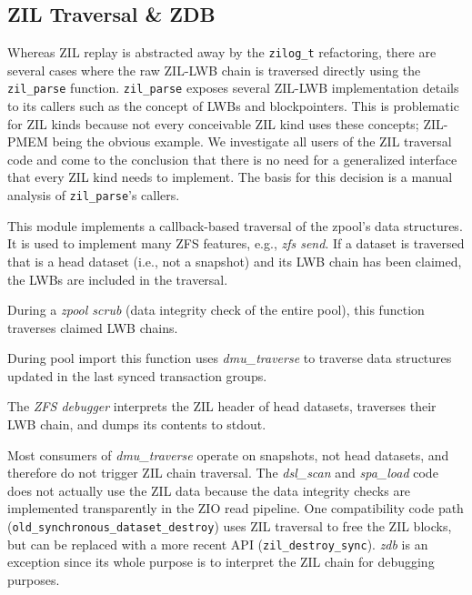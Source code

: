 \documentclass[12pt,a4paper,twoside]{book}
\begin{document}
\subsection{ZIL Traversal \& ZDB}\label{sec:zil_kinds:traversal}
Whereas ZIL replay is abstracted away by the \lstinline{zilog_t} refactoring, there are several cases where the raw ZIL-LWB chain is traversed directly using the \lstinline{zil_parse} function.
\lstinline{zil_parse} exposes several ZIL-LWB implementation details to its callers such as the concept of LWBs and blockpointers.
This is problematic for ZIL kinds because not every conceivable ZIL kind uses these concepts; ZIL-PMEM being the obvious example.
We investigate all users of the ZIL traversal code and come to the conclusion that there is no need for a generalized interface that every ZIL kind needs to implement.
The basis for this decision is a manual analysis of \lstinline{zil_parse}'s callers.
\begin{description}[noitemsep]
    \item[dmu\_traverse] This module implements a callback-based traversal of the zpool's data structures.
    It is used to implement many ZFS features, e.g., \textit{zfs send}.
    If a dataset is traversed that is a head dataset (i.e., not a snapshot) and its LWB chain has been claimed, the LWBs are included in the traversal.
    \item[dsl\_scan\_zil] During a \textit{zpool scrub} (data integrity check of the entire pool), this function traverses claimed LWB chains.
    \item[spa\_load\_verify] During pool import this function uses \textit{dmu\_traverse} to traverse data structures updated in the last synced transaction groups.
    \item[zdb\_il.c] The \textit{ZFS debugger} interprets the ZIL header of head datasets, traverses their LWB chain, and dumps its contents to stdout.
\end{description}
Most consumers of \textit{dmu\_traverse} operate on snapshots, not head datasets, and therefore do not trigger ZIL chain traversal.
The \textit{dsl\_scan} and \textit{spa\_load} code does not actually use the ZIL data because the data integrity checks are implemented transparently in the ZIO read pipeline.
One compatibility code path (\lstinline{old_synchronous_dataset_destroy}) uses ZIL traversal to free the ZIL blocks, but can be replaced with a more recent API (\lstinline{zil_destroy_sync}).
\textit{zdb} is an exception since its whole purpose is to interpret the ZIL chain for debugging purposes.
\end{document}
